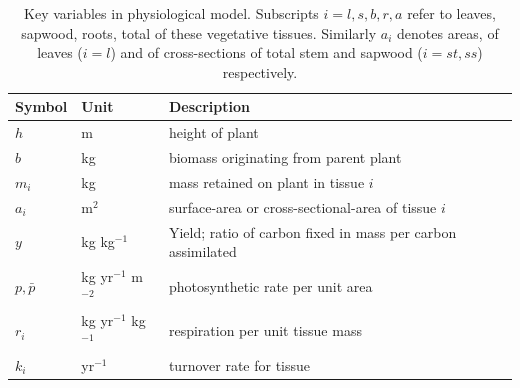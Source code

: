 \documentclass[10pt,twoside]{article}
\begin{document}
\begin{table}[h!]
 \caption{Key variables in physiological model. 
 Subscripts $i=l,s,b,r,a$ refer to leaves, sapwood, roots, total of these vegetative tissues. Similarly $a_i$ denotes areas, of leaves ($i=l$) and of cross-sections of total stem and sapwood ($i= st,ss$) respectively.}
\centering
  \begin{tabular}{p{2cm}p{2cm}p{8cm}}
  \hline
  Symbol & Unit & Description \\
  \hline
  $h$   & m  & height of plant\\
  $b$   & kg  & biomass originating from parent plant\\
  $m_i$ & kg  & mass retained on plant in tissue $i$\\
  $a_i$ & m$^2$  & surface-area or cross-sectional-area of tissue $i$\\
  $y$ & kg kg$^{-1}$ & Yield; ratio of carbon fixed in mass per carbon assimilated \\
  $p,\bar{p}$ & kg yr$^{-1}$ m$^{-2}$  & photosynthetic rate per unit area \\
  $r_i$ & kg yr$^{-1}$ kg$^{-1}$  & respiration per unit tissue mass \\
  $k_i$ & yr$^{-1}$ & turnover rate for tissue \\
  \hline
  \end{tabular}
\label{tab:definitions}
\end{table}

\newpage
\end{document}
